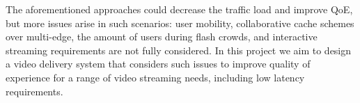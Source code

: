 The aforementioned approaches could decrease the traffic load and improve QoE, but more issues arise in such scenarios: user mobility, collaborative cache schemes over multi-edge, the amount of users during flash crowds, and interactive streaming requirements are not fully considered. In this project we aim to design a video delivery system that considers such issues to improve quality of experience for a range of video streaming needs, including low latency requirements.


%
%
